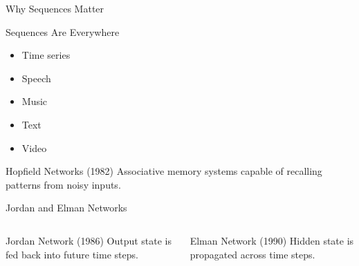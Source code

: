 \documentclass{beamer}
\begin{document}
\begin{frame}{Why Sequences Matter}

\begin{block}{Sequences Are Everywhere}
\begin{itemize}
\item Time series
\item Speech
\item Music
\item Text
\item Video
\end{itemize}
\end{block}

\vspace{0.2cm}

\begin{exampleblock}{Hopfield Networks (1982)}
Associative memory systems capable of recalling patterns from noisy inputs.
\end{exampleblock}

\end{frame}


\begin{frame}{Jordan and Elman Networks}

\begin{columns}


\begin{block}{Jordan Network (1986)}
Output state is fed back into future time steps.
\end{block}


\begin{block}{Elman Network (1990)}
Hidden state is propagated across time steps.
\end{block}

\end{columns}

\end{frame}

\end{document}
